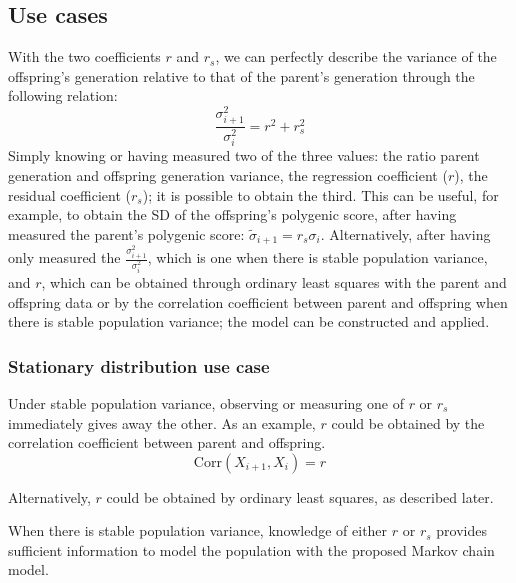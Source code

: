 \documentclass[letterpaper,10pt]{article} %
\begin{document}
\subsection*{Use cases}
With the two coefficients $r$ and $r_s$, we can perfectly describe the variance of the offspring's generation relative to that of the parent's generation through the following relation:
%
$$\frac{\sigma_{i+1}^2}{\sigma_i^2} = r^2+r_s^2$$
%
Simply knowing or having measured two of the three values: the ratio parent generation and offspring generation variance, the regression coefficient ($r$), the residual coefficient ($r_s$); it is possible to obtain the third.
%
This can be useful, for example, to obtain the SD of the offspring's polygenic score, after having measured the parent's polygenic score: $\tilde{\sigma}_{i+1} = r_s \sigma_i$.
%
Alternatively, after having only measured the $\frac{\sigma_{i+1}^2}{\sigma_i^2}$, which is one when there is stable population variance, and $r$, which can be obtained through ordinary least squares with the parent and offspring data or by the correlation coefficient between parent and offspring when there is stable population variance; the model can be constructed and applied.


\subsubsection*{Stationary distribution use case}
Under stable population variance, observing or measuring one of $r$ or $r_s$ immediately gives away the other. As an example, $r$ could be obtained by the correlation coefficient between parent and offspring.  
$$\mathrm{Corr}(X_{i+1}, X_i) = r$$

Alternatively, $r$ could be obtained by ordinary least squares, as described later.

When there is stable population variance, knowledge of either $r$ or $r_s$ provides sufficient information to model the population with the proposed Markov chain model.





\clearpage





\end{document}
